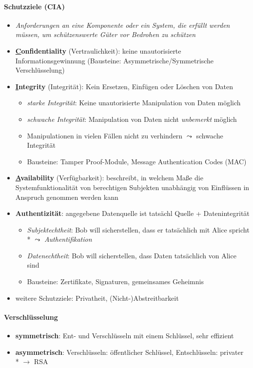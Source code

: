 \paragraph{Schutzziele (CIA)}
\begin{itemize}
  \item \emph{Anforderungen an eine Komponente oder ein System, die erfüllt werden müssen, um schützenswerte Güter vor Bedrohen zu schützen}
  \item \textbf{\underline{C}onfidentiality} (Vertraulichkeit): keine unautorisierte Informationsgewinnung (Bausteine: Asymmetrische/Symmetrische Verschlüsselung)
  \item \textbf{\underline{I}ntegrity} (Integrität): Kein Ersetzen, Einfügen oder Löschen von Daten
  \begin{itemize}
    \item \emph{starke Integrität}: Keine unautorisierte Manipulation von Daten möglich
    \item \emph{schwache Integrität}: Manipulation von Daten nicht \emph{unbemerkt} möglich
    \item Manipulationen in vielen Fällen nicht zu verhindern \( \leadsto \) schwache Integrität
    \item Bausteine: Tamper Proof-Module, Message Authentication Codes (MAC)
  \end{itemize}
   \item \textbf{\underline{A}vailability} (Verfügbarkeit): beschreibt, in welchem Maße die Systemfunktionalität von berechtigen Subjekten unabhängig von Einflüssen in Anspruch genommen werden kann
   \item \textbf{Authentizität}: angegebene Datenquelle ist tatsächl Quelle + Datenintegrität
   \begin{itemize}
    \item \emph{Subjektechtheit}: Bob will sicherstellen, dass er tatsächlich mit Alice spricht \\* \( \leadsto \) \emph{Authentifikation}
    \item \emph{Datenechtheit}: Bob will sicherstellen, dass Daten tatsächlich von Alice sind
    \item Bausteine: Zertifikate, Signaturen, gemeinsames Geheimnis
   \end{itemize}
  \item weitere Schutzziele: Privatheit, (Nicht-)Abstreitbarkeit
\end{itemize}

\paragraph{Verschlüsselung}
\begin{itemize}
	\item \textbf{symmetrisch}: Ent- und Verschlüsseln mit einem Schlüssel, sehr effizient
	\item \textbf{asymmetrisch}: Verschlüsseln: öffentlicher Schlüssel, Entschlüsseln: privater \\* \( \to \) RSA
\end{itemize}

